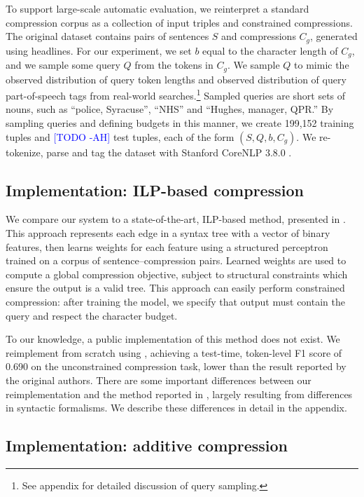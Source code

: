 \documentclass[11pt,a4paper]{article}
\newcommand{\ahcomment}[1]{\textcolor{blue}{[#1 -AH]}}
\begin{document}
To support large-scale automatic evaluation, we reinterpret a standard compression corpus \cite{filippova2013overcoming}
as a collection of input triples and constrained compressions. The original dataset contains pairs of sentences $S$ and compressions $C_g$, generated using headlines. For our experiment, we set $b$ equal to  the character length of $C_g$, and we sample some query $Q$ from the tokens in $C_g$. We sample $Q$ to mimic the observed distribution of query token lengths \cite{Jansen2000RealLR} and observed distribution of query part-of-speech tags \cite{Barr2008TheLS} from real-world searches.\footnote{See appendix for detailed discussion of query sampling.} Sampled queries are short sets of nouns, such as ``police, Syracuse'', ``NHS'' and ``Hughes, manager, QPR.'' By sampling queries and defining budgets in this manner, we create {199,152} training tuples and {\ahcomment{TODO}} test tuples, each of the form $(S,Q,b,C_g)$. We re-tokenize, parse and tag the dataset with Stanford CoreNLP 3.8.0 \cite{corenlp}.

\subsection{Implementation: ILP-based compression}\label{s:ilp}

We compare our system to a state-of-the-art, ILP-based method, presented in \citet{filippova2013overcoming}. This approach represents each edge in a syntax tree with a vector of binary features, then learns weights for each feature using a structured perceptron trained on a corpus of sentence--compression pairs. Learned weights are used to compute a global compression objective, subject to structural constraints which ensure the output is a valid tree. This approach can easily perform constrained compression: after training the model, we specify that output must contain the query and respect the character budget.

To our knowledge, a public implementation of this method does not exist. We reimplement from scratch using \citet{gurobi}, achieving a test-time, token-level F1 score of  0.690 on the unconstrained compression task, lower than the result reported by the original authors. There are some important differences between our reimplementation and the method reported in \citet{filippova2013overcoming}, largely resulting from differences in syntactic formalisms. We describe these differences in detail in the appendix.

\subsection{Implementation: additive compression}\label{s:transition}
\end{document}
